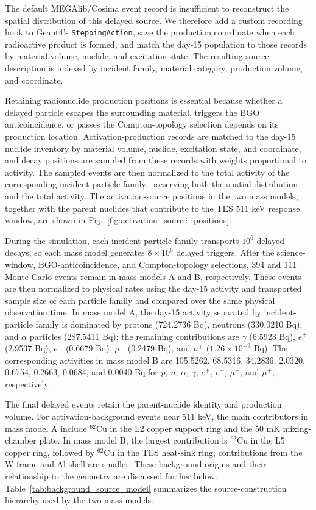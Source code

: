 \documentclass[11pt]{article}
\begin{document}
The default MEGAlib/Cosima event record is insufficient to reconstruct the
spatial distribution of this delayed source. We therefore add a custom recording
hook to Geant4's \texttt{SteppingAction}, save the production coordinate when each
radioactive product is formed, and match the day-15 population to those records by
material volume, nuclide, and excitation state. The resulting source description
is indexed by incident family, material category, production volume, and
coordinate.

Retaining radionuclide production positions is essential because whether a
delayed particle escapes the surrounding material, triggers the BGO
anticoincidence, or passes the Compton-topology selection depends on its production
location. Activation-production records are matched to the day-15 nuclide
inventory by material volume, nuclide, excitation state, and coordinate, and decay
positions are sampled from these records with weights proportional to activity.
The sampled events are then normalized to the total activity of the corresponding
incident-particle family, preserving both the spatial distribution and the total
activity. The activation-source positions in the two mass models, together with
the parent nuclides that contribute to the TES 511 keV response window, are shown
in Fig.~\ref{fig:activation_source_positions}.

During the simulation, each incident-particle family transports $10^6$ delayed
decays, so each mass model generates $8\times10^6$ delayed triggers. After the
science-window, BGO-anticoincidence, and Compton-topology selections, 394 and 111
Monte Carlo events remain in mass models A and B, respectively. These events are
then normalized to physical rates using the day-15 activity and transported sample
size of each particle family and compared over the same physical observation time.
In mass model A, the day-15 activity separated
by incident-particle family is dominated by protons (724.2736 Bq), neutrons
(330.0210 Bq), and $\alpha$ particles (287.5411 Bq); the remaining contributions
are $\gamma$ (6.5923 Bq), $e^+$ (2.9537 Bq), $e^-$ (0.6679 Bq), $\mu^-$
(0.2479 Bq), and $\mu^+$ ($1.26\times10^{-9}$ Bq). The corresponding activities
in mass model B are 105.5262, 68.5316, 34.2836, 2.0320, 0.6754, 0.2663, 0.0684,
and 0.0040 Bq for $p$, $n$, $\alpha$, $\gamma$, $e^+$, $e^-$, $\mu^-$, and
$\mu^+$, respectively.

The final delayed events retain the parent-nuclide identity and production volume.
For activation-background events near 511 keV, the main contributors in mass
model A include $^{62}\mathrm{Cu}$ in the L2 copper support ring and the 50 mK
mixing-chamber plate. In mass model B, the largest contribution is
$^{62}\mathrm{Cu}$ in the L5 copper ring, followed by $^{62}\mathrm{Cu}$ in the
TES heat-sink ring; contributions from the W frame and Al shell are smaller.
These background origins and their relationship to the geometry are discussed
further below. Table~\ref{tab:background_source_model} summarizes the
source-construction hierarchy used by the two mass models.
\end{document}
